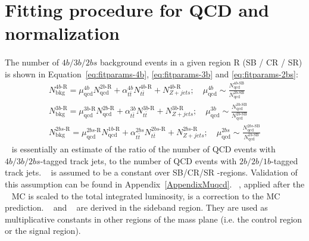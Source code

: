 \section{Fitting procedure for QCD and \ttbar~ normalization}
\label{sec:ttbarnorm}

\paragraph{}
The number of $4b/3b/2bs$ background events in a given region R (SB / CR / SR) is shown in Equation~\ref{eq:fitparams-4b}, \ref{eq:fitparams-3b} and \ref{eq:fitparams-2bs}:
\begin{eqnarray}
\label{eq:fitparams-4b}
N^{4b\text{-R}}_{\text{bkg}} = \mu_{\text{qcd}}^{4b} N^{2b\text{-R}}_{\text{qcd}} + \alpha_{t\bar{t}}^{4b} N^{4b\text{-R}}_{t\bar{t}} + N^{4b\text{-R}}_{Z+jets};
\quad \mu_{\text{qcd}}^{4b} \sim \frac{N^{4b\text{-SB}}_{\text{qcd}}}{N^{2b\text{-SB}}_{\text{qcd}}}
\\
\label{eq:fitparams-3b}
N^{3b\text{-R}}_{\text{bkg}} = \mu_{\text{qcd}}^{3b\text{-R}} N^{2b\text{-R}}_{\text{qcd}} + \alpha_{t\bar{t}}^{3b} N^{3b\text{-R}}_{t\bar{t}} + N^{3b\text{-R}}_{Z+jets} ;
\quad \mu_{\text{qcd}}^{3b} \sim \frac{N^{3b\text{-SB}}_{\text{qcd}}}{N^{2b\text{-SB}}_{\text{qcd}}}\\
\label{eq:fitparams-2bs}
N^{2bs\text{-R}}_{\text{bkg}} = \mu_{\text{qcd}}^{2bs\text{-R}} N^{1b\text{-R}}_{\text{qcd}} + \alpha_{t\bar{t}}^{2bs} N^{2bs\text{-R}}_{t\bar{t}} + N^{2bs\text{-R}}_{Z+jets};
\quad \mu_{\text{qcd}}^{2bs} \sim \frac{N^{2bs\text{-SB}}_{\text{qcd}}}{N^{1b\text{-SB}}_{\text{qcd}}}
\end{eqnarray} 
\muqcd~ is essentially an estimate of the ratio of the number of QCD events with $4b/3b/2bs$-tagged track jets, to the number of QCD events with $2b/2b/1b$-tagged track jets.
\muqcd~ is assumed to be a constant over SB/CR/SR \mleadJ-\msublJ regions.
Validation of this assumption can be found in Appendix~\ref{AppendixMuqcd}.
\alphatt~, applied after the \ttbar~ MC is scaled to the total integrated luminosity, is a correction to the MC prediction.
\muqcd~ and \alphatt~ are derived in the sideband region.
They are used as multiplicative constants in other regions of the mass plane (i.e. the control region or the signal region).

